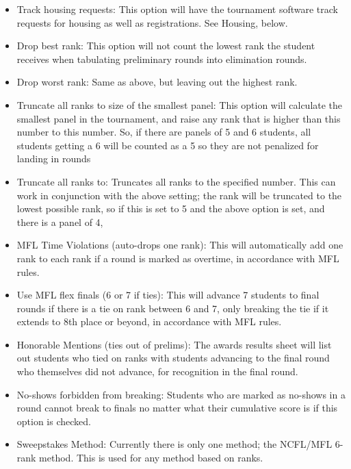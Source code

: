 \documentclass[12pt]{report} \usepackage {fullpage} \usepackage{times}
\begin{document}
\begin{itemize}
\item Track housing requests: 	This option will have the tournament
software track requests for housing as well as registrations.  See Housing,
below.

\item Drop best rank:  This option will not count the lowest rank the
student receives when tabulating preliminary rounds into elimination
rounds.  

\item Drop worst rank:  Same as above, but leaving out the highest rank.

\item Truncate all ranks to size of the smallest panel:  This option will
calculate the smallest panel in the tournament, and raise any rank that is
higher than this number to this number.  So, if there are panels of 5 and 6
students, all students getting a 6 will be counted as a 5 so they are not
penalized for landing in rounds 

\item Truncate all ranks to:  Truncates all ranks to the specified number.
This can work in conjunction with the above setting; the rank will be
truncated to the lowest possible rank, so if this is set to 5 and the above
option is set, and there is a panel of 4, 

\item MFL Time Violations (auto-drops one rank):   This will automatically
add one rank to each rank if a round is marked as overtime, in accordance
with MFL rules.

\item Use MFL flex finals (6 or 7 if ties): 	This will advance 7
students to final rounds if there is a tie on rank between 6 and 7, only
breaking the tie if it extends to 8th place or beyond, in accordance with
MFL rules.

\item Honorable Mentions (ties out of prelims): The awards results sheet
will list out students who tied on ranks with students advancing to the
final round who themselves did not advance, for recognition in the final
round.

\item No-shows forbidden from breaking: 	Students who are marked as
no-shows in a round cannot break to finals no matter what their cumulative
score is if this option is checked.

\item Sweepstakes Method:    Currently there is only one method;  the
NCFL/MFL  6-rank method.  This is used for any method based on ranks.


\end{itemize}
\end{document}
